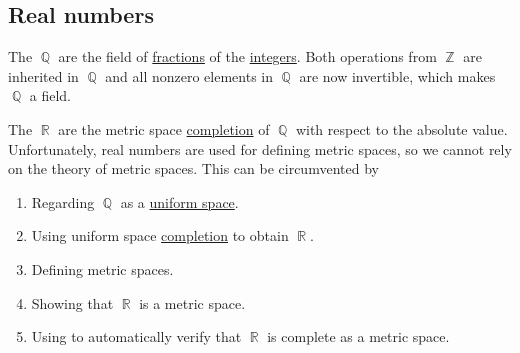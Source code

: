 \subsection{Real numbers}\label{subsec:real_numbers}

\begin{definition}\label{def:rational_numbers}
  The  \( \BbbQ \) are the field of \hyperref[def:ring_localization]{fractions} of the \hyperref[def:integers]{integers}. Both operations from \( \BbbZ \) are inherited in \( \BbbQ \) and all nonzero elements in \( \BbbQ \) are now invertible, which makes \( \BbbQ \) a field.
\end{definition}

\begin{definition}\label{def:real_numbers}
  The  \( \BbbR \) are the metric space \hyperref[def:complete_metric_space]{completion} of \( \BbbQ \) with respect to the absolute value. Unfortunately, real numbers are used for defining metric spaces, so we cannot rely on the theory of metric spaces. This can be circumvented by
  \begin{enumerate}
    \item Regarding \( \BbbQ \) as a \hyperref[def:uniform_space]{uniform space}.
    \item Using uniform space \hyperref[thm:uniform_space_completion]{completion} to obtain \( \BbbR \).
    \item Defining metric spaces.
    \item Showing that \( \BbbR \) is a metric space.
    \item Using  to automatically verify that \( \BbbR \) is complete as a metric space.
  \end{enumerate}
\end{definition}


